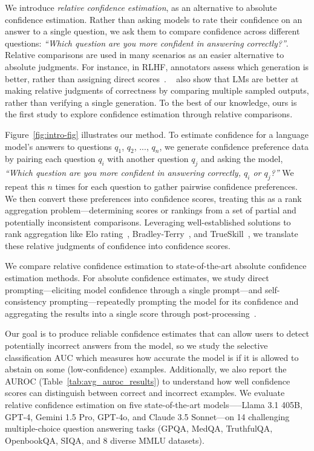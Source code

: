 We introduce \textit{relative confidence estimation}, as an alternative to absolute confidence estimation. Rather than asking models to rate their confidence on an answer to a single question, we ask them to compare confidence across different questions: \textit{``Which question are you more confident in answering correctly?''}. Relative comparisons are used in many scenarios as an easier alternative to absolute judgments. For instance, in RLHF, annotators assess which generation is better, rather than assigning direct scores~\citep{instruct-gpt}. ~\cite{kadavath2022language} also show that LMs are better at making relative judgments of correctness by comparing multiple sampled outputs, rather than verifying a single generation. To the best of our knowledge, ours is the first study to explore confidence estimation through relative comparisons.

Figure~\ref{fig:intro-fig} illustrates our method. To estimate confidence for a language model's answers to questions $q_1$, $q_2$, ..., $q_n$, we generate confidence preference data by pairing each question $q_i$  with another question $q_j$  and asking the model, \textit{``Which question are you more confident in answering correctly, $q_i$ or $q_j$?''} We repeat this $n$ times for each question to gather pairwise confidence preferences. We then convert these preferences into confidence scores, treating this as a rank aggregation problem---determining scores or rankings from a set of partial and potentially inconsistent comparisons. Leveraging well-established solutions to rank aggregation like Elo rating~\citep{elo_ratings}, Bradley-Terry~\citep{bradley_terry}, and TrueSkill~\citep{true_skill}, we translate these relative judgments of confidence into confidence scores.

We compare relative confidence estimation to state-of-the-art absolute confidence estimation methods. For absolute confidence estimates, we study direct prompting---eliciting model confidence through a single prompt---and self-consistency prompting---repeatedly prompting the model for its confidence and aggregating the results into a single score through post-processing~\citep{xiong2023can}. 

Our goal is to produce reliable confidence estimates that can allow users to detect potentially incorrect answers from the model, so we study the selective classification AUC which measures how accurate the model is if it is allowed to abstain on some (low-confidence) examples. Additionally, we also report the AUROC (Table~\ref{tab:avg_auroc_results}) to understand how well confidence scores can distinguish between correct and incorrect examples.
We evaluate relative confidence estimation on five state-of-the-art models—--Llama 3.1 405B, GPT-4, Gemini 1.5 Pro, GPT-4o, and Claude 3.5 Sonnet---on 14 challenging multiple-choice question answering tasks (GPQA, MedQA, TruthfulQA, OpenbookQA, SIQA, and 8 diverse MMLU datasets). 

